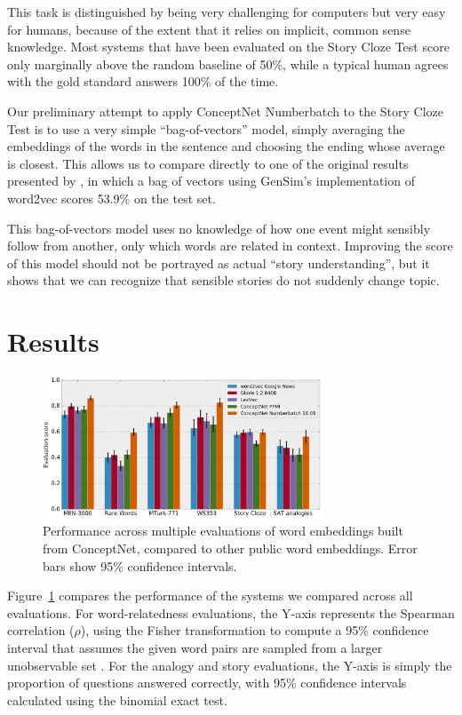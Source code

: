 \documentclass[letterpaper]{article}
\begin{document}
This task is distinguished by being very challenging for computers but very
easy for humans, because of the extent that it relies on implicit, common sense
knowledge. Most systems that have been evaluated on the Story Cloze Test
score only marginally above the random baseline of 50\%, while a typical
human agrees with the gold standard answers 100\% of the time.

Our preliminary attempt to apply ConceptNet Numberbatch to the Story Cloze Test
is to use a very simple ``bag-of-vectors'' model, simply averaging the
embeddings of the words in the sentence and choosing the ending whose average is
closest. This allows us to compare directly to one of the original results presented by
\citeauthor{mostafazadeh2016cloze}, in which a bag of vectors using GenSim's
implementation of word2vec scores 53.9\% on the test set.

This bag-of-vectors model uses no knowledge of how one event might sensibly
follow from another, only which words are related in context. Improving the
score of this model should not be portrayed as actual ``story understanding'',
but it shows that we can recognize that sensible stories do not suddenly change
topic.

\section{Results}
\begin{figure}
\centering
\includegraphics[width=3.3in]{eval-graph.png}
\caption{
    Performance across multiple evaluations of word embeddings built from
    ConceptNet, compared to other public word embeddings. Error bars
    show 95\% confidence intervals.
}
\label{eval-results}
\end{figure}

Figure~\ref{eval-results} compares the performance of the systems we compared
across all evaluations. For word-relatedness evaluations, the Y-axis represents
the Spearman correlation ($\rho$), using the Fisher transformation to compute a
95\% confidence interval that assumes the given word pairs are sampled from a
larger unobservable set \cite{bonett2000sample}. For the analogy and story evaluations,
the Y-axis is simply the proportion of questions answered correctly, with 95\%
confidence intervals calculated using the binomial exact test.
\end{document}
